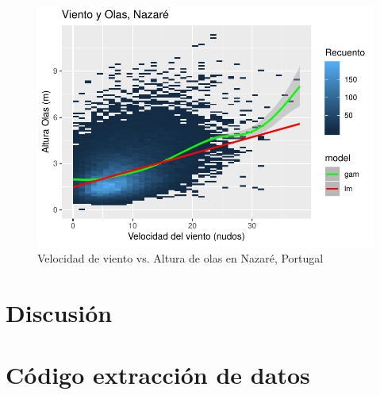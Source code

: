 \begin{figure}[H]
\label{fig:wind_waves_jaws_all}
\centering
\includegraphics{./figures/nazare_all.pdf}
  \caption{Velocidad de viento vs. Altura de olas en Nazaré, Portugal}
\end{figure}

%
%
%

\section{Discusión}%
\label{sec:discusión}

\pagebreak
\appendix

\section{Código extracción de datos}%
\label{sec:codigo_extraccion_de_datos}




